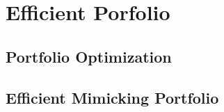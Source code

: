 \chapter{Efficient Porfolio}


\section{Portfolio Optimization}


\section{Efficient Mimicking Portfolio}


